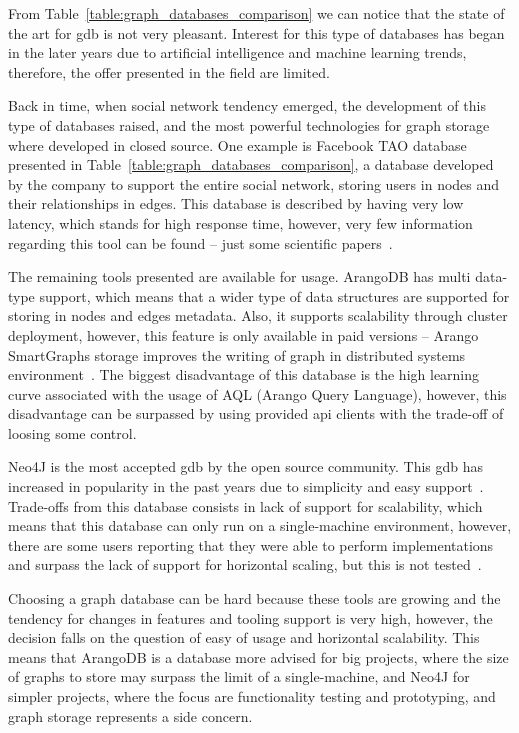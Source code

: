 From Table~\ref{table:graph_databases_comparison} we can notice that the state of the art for \gls{gdb} is not very pleasant. Interest for this type of databases has began in the later years due to artificial intelligence and machine learning trends, therefore, the offer presented in the field are limited.

Back in time, when social network tendency emerged, the development of this type of databases raised, and the most powerful technologies for graph storage where developed in closed source. One example is Facebook TAO database presented in Table~\ref{table:graph_databases_comparison}, a database developed by the company to support the entire social network, storing users in nodes and their relationships in edges. This database is described by having very low latency, which stands for high response time, however, very few information regarding this tool can be found -- just some scientific papers~\cite{facebook_tao_article,Facebook2150}.

The remaining tools presented are available for usage. ArangoDB has multi data-type support, which means that a wider type of data structures are supported for storing in nodes and edges metadata. Also, it supports scalability through cluster deployment, however, this feature is only available in paid versions -- Arango SmartGraphs storage improves the writing of graph in distributed systems environment~\cite{arangodb_smart_graphs}. The biggest disadvantage of this database is the high learning curve associated with the usage of AQL (Arango Query Language), however, this disadvantage can be surpassed by using provided \gls{api} clients with the trade-off of loosing some control.

Neo4J is the most accepted \gls{gdb} by the open source community. This \gls{gdb}
has increased in popularity in the past years due to simplicity and easy support~\cite{Turu2017}. Trade-offs from this database consists in lack of support for scalability, which means that this database can only run on a single-machine environment, however, there are some users reporting that they were able to perform implementations and surpass the lack of support for horizontal scaling, but this is not tested~\cite{neo4j_scalable}.

Choosing a graph database can be hard because these tools are growing and the tendency for changes in features and tooling support is very high, however,  the decision falls on the question of easy of usage and horizontal scalability. This means that ArangoDB is a database more advised for big projects, where the size of graphs to store may surpass the limit of a single-machine, and Neo4J for simpler projects, where the focus are functionality testing and prototyping, and graph storage represents a side concern.

